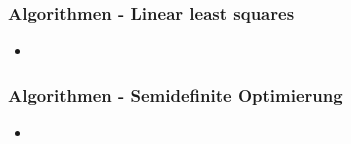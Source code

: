 \begin{frame}
  \frametitle{Algorithmen - Linear least squares}

  \begin{itemize}
  \item 
  \end{itemize}
\end{frame}

\begin{frame}
  \frametitle{Algorithmen - Semidefinite Optimierung}

  \begin{itemize}
  \item 
  \end{itemize}
\end{frame}
